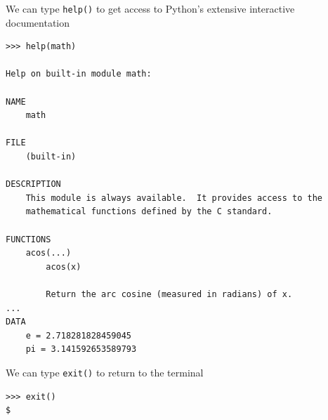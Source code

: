 \documentclass[8pt,a4paper,compress]{beamer}
\begin{document}
\begin{frame}[fragile]
\pause

We can type \lstinline{help()} to get access to Python's extensive interactive documentation
\begin{lstlisting}[language={}]
>>> help(math)

Help on built-in module math:

NAME
    math

FILE
    (built-in)

DESCRIPTION
    This module is always available.  It provides access to the
    mathematical functions defined by the C standard.

FUNCTIONS
    acos(...)
        acos(x)
        
        Return the arc cosine (measured in radians) of x.
...
DATA
    e = 2.718281828459045
    pi = 3.141592653589793
\end{lstlisting}

\pause
\bigskip

We can type \lstinline{exit()} to return to the terminal
\begin{lstlisting}[language={}]
>>> exit()
$
\end{lstlisting}
\end{frame}
\end{document}
